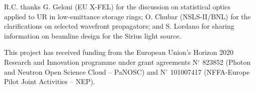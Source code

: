 \documentclass{iucr}              %
\begin{document}


R.C. thanks G. Geloni (EU X-FEL) for the discussion on statistical optics applied to UR in low-emittance storage rings; O. Chubar (NSLS-II/BNL) for the clarifications on selected wavefront propagators; and S. Lordano for sharing information on beamline design for the Sirius light source.


This project has received funding from the European Union’s Horizon 2020 Research and Innovation programme under grant agreements N$^{\circ}$ 823852 (Photon and Neutron Open Science Cloud -- PaNOSC) and N$^{\circ}$ 101007417 (NFFA-Europe Pilot Joint Activities -- NEP).








     
\end{document}
